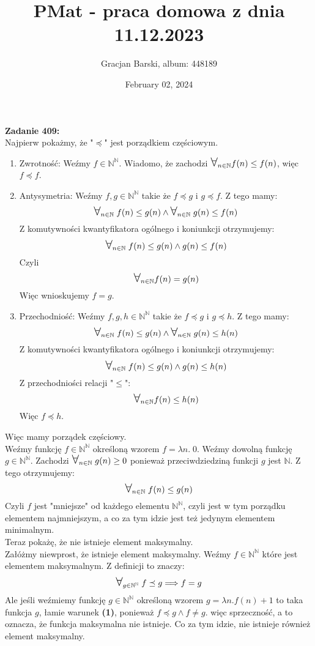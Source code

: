 \documentclass[10pt]{article}
\title{PMat - praca domowa z dnia 11.12.2023}
\author{Gracjan Barski, album: 448189}
\date{February 02, 2024}
\newcommand{\N}{\mathbb{N}}
\newcommand{\Forall}{{\Large\mbox{$\forall$}}}
\begin{document}
\maketitle
\textbf{Zadanie 409:} \\[10pt]
Najpierw pokażmy, że "$\preceq$" jest porządkiem częściowym. \\[5pt]
\begin{enumerate}[1)]
    \item Zwrotność: Weźmy $f \in \N^\N$. Wiadomo, że zachodzi $\Forall_{n \in \N} f(n) \leq f(n)$, więc $f \preceq f$.
    \item Antysymetria: Weźmy $f, g \in \N^\N$ takie że $f \preceq g$ i $g \preceq f$. Z tego mamy:
    $$\Forall_{n \in \N} \; f(n) \leq g(n) \land \Forall_{n \in \N} \; g(n) \leq f(n)$$
    Z komutywności kwantyfikatora ogólnego i koniunkcji otrzymujemy:
    $$\Forall_{n \in \N} \; f(n) \leq g(n) \land g(n) \leq f(n)$$
    Czyli
    $$\Forall_{n \in \N} f(n) = g(n)$$
    Więc wnioskujemy $f = g$.
    \item Przechodniość: Weźmy $f, g, h \in \N^\N$ takie że $f \preceq g$ i $g \preceq h$. Z tego mamy:
    $$\Forall_{n \in \N} \; f(n) \leq g(n) \land \Forall_{n \in \N} \; g(n) \leq h(n)$$
    Z komutywności kwantyfikatora ogólnego i koniunkcji otrzymujemy:
    $$\Forall_{n \in \N} \; f(n) \leq g(n) \land g(n) \leq h(n)$$
    Z przechodniości relacji "$\leq$":
    $$\Forall_{n \in \N} f(n) \leq h(n)$$
    Więc $f \preceq h$.
\end{enumerate}
Więc mamy porządek częściowy. \\[10pt]
Weźmy funkcję $f \in \N^\N$ określoną wzorem $f = \lambda n. \; 0$. Weźmy dowolną funkcję $g \in \N^\N$. Zachodzi $\Forall_{n \in \N} \; g(n) \geq 0$ ponieważ przeciwdziedziną funkcji $g$ jest $\N$. Z tego otrzymujemy:
$$\Forall_{n \in \N} \; f(n) \leq g(n)$$
Czyli $f$ jest "mniejsze" od każdego elementu $\N^\N$, czyli jest w tym porządku elementem najmniejszym, a co za tym idzie jest też jedynym elementem minimalnym. \\[10pt]
Teraz pokażę, że nie istnieje element maksymalny. \\[5pt]
Załóżmy niewprost, że istnieje element maksymalny. Weźmy $f \in \N^\N$ które jest elementem maksymalnym. Z definicji to znaczy:
\begin{align}
\Forall_{g \in \N^\N} \; f \preceq g \Longrightarrow f = g
\end{align}
Ale jeśli weźmiemy funkcję $g \in \N^\N$ określoną wzorem $g = \lambda n. f(n) + 1$ to taka funkcja $g$, łamie warunek \textbf{(1)}, ponieważ $f \preceq g \land f \neq g$. więc sprzeczność, a to oznacza, że funkcja maksymalna nie istnieje. Co za tym idzie, nie istnieje również element maksymalny. \\[10pt]
\end{document}
